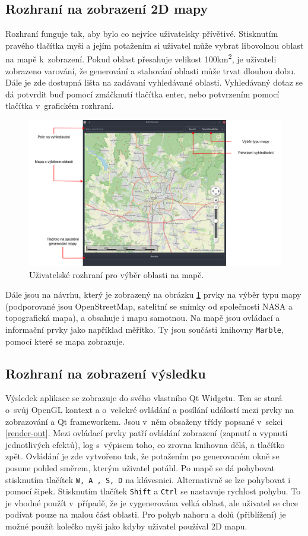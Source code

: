 \subsection*{Rozhraní na zobrazení 2D mapy}
Rozhraní funguje tak, aby bylo co nejvíce uživatelsky přívětivé. Stisknutím pravého tlačítka myši a jejím potažením si uživatel může vybrat libovolnou oblast na mapě k~zobrazení. Pokud oblast přesahuje velikost 100km\textsuperscript{2}, je uživateli zobrazeno varování, že generování a stahování oblasti může trvat dlouhou dobu. Dále je zde dostupná lišta na zadávaní vyhledávané oblasti. Vyhledávaný dotaz se dá potvrdit buď pomocí zmáčknutí tlačítka enter, nebo potvrzením pomocí tlačítka v~grafickém rozhraní.
\begin{figure}[H]
	\centering
	\includegraphics[width=36em]{images/impl/map-gui.png}
	\caption[caption]{Uživatelské rozhraní pro výběr oblasti na mapě.} 
	\label{gui-mapa}
\end{figure}
Dále jsou na návrhu, který je zobrazený na obrázku \ref{gui-mapa} prvky na výběr typu mapy (podporované jsou OpenStreetMap, satelitní se snímky od společnosti NASA a topografická mapa), a obsahuje i mapu samotnou. Na mapě jsou ovládací a informační prvky jako například měřítko. Ty jsou součásti knihovny \verb|Marble|, pomocí které se mapa zobrazuje.

\subsection*{Rozhraní na zobrazení výsledku}
Výsledek aplikace se zobrazuje do svého vlastního Qt Widgetu. Ten se stará o~svůj OpenGL kontext a o~vešekré ovládání a posílání událostí mezi prvky na zobrazování a Qt frameworkem. Jsou v~něm obsaženy třídy popsané v~sekci \ref{render-out}. Mezi ovládací prvky patří ovládání zobrazení (zapnutí a vypnutí jednotlivých efektů), log s~výpisem toho, co zrovna knihovna dělá, a tlačítko zpět. Ovládání je zde vytvořeno tak, že potažením po generovaném okně se posune pohled směrem, kterým uživatel potáhl. Po mapě se dá pohybovat stisknutím tlačítek \verb|W, A , S, D| na klávesnici. Alternativně se lze pohybovat i pomocí šipek. Stisknutím tlačítek \verb|Shift| a \verb|Ctrl| se nastavuje rychlost pohybu. To je vhodné použít v~případě, že je vygenerována velká oblast, ale uživatel se chce podívat pouze na malou část oblasti. Pro pohyb nahoru a dolů (přiblížení) je možné použít kolečko myši jako kdyby uživatel používal 2D mapu.


